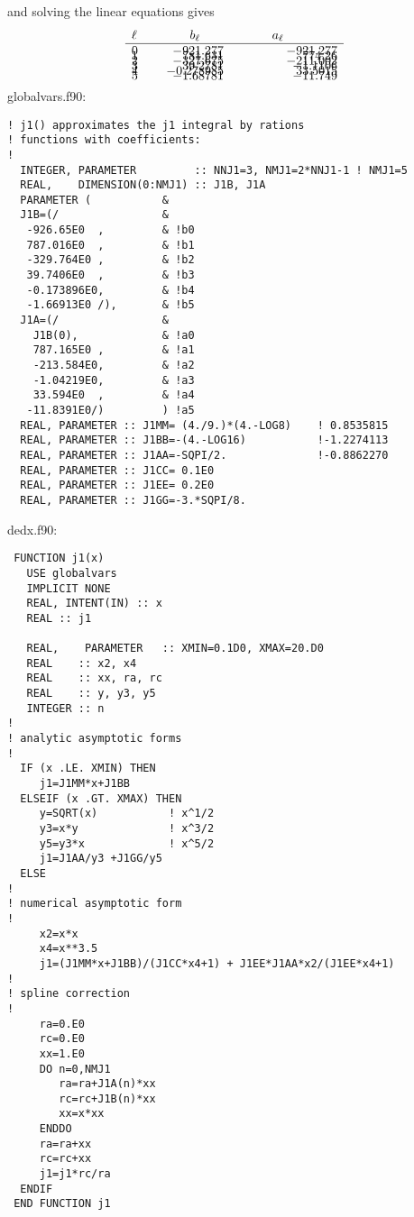 \documentclass[preprint,12pt,eqsecnum,nofootinbib,amsmath,amssymb]{revtex4}
\begin{document}
and solving the linear equations gives
\begin{eqnarray}
  \begin{array}{lrr}
  \ell~~~~ & \hfill b_\ell \hfill & \hskip1cm a_\ell \hskip1.5cm  \\ \hline
  0    &    -921.277      &   -921.277    \\[-8pt]
  1    &     781.631      &    774.26     \\[-8pt]
  2    &    -327.675      &   -211.002    \\[-8pt]
  3    &     39.2781      &   -1.1106     \\[-8pt]
  4    &    -0.278985     &   33.5015     \\[-8pt]
  5    &   -1.68781       &  -11.749      \\[-8pt]
  \end{array}
\end{eqnarray}


{
\noindent
globalvars.f90:
\baselineskip12pt
\begin{verbatim}
! j1() approximates the j1 integral by rations
! functions with coefficients:
!
  INTEGER, PARAMETER         :: NNJ1=3, NMJ1=2*NNJ1-1 ! NMJ1=5
  REAL,    DIMENSION(0:NMJ1) :: J1B, J1A
  PARAMETER (           &
  J1B=(/                &
   -926.65E0  ,         & !b0
   787.016E0  ,         & !b1
   -329.764E0 ,         & !b2
   39.7406E0  ,         & !b3
   -0.173896E0,         & !b4
   -1.66913E0 /),       & !b5
  J1A=(/                &
    J1B(0),             & !a0
    787.165E0 ,         & !a1
    -213.584E0,         & !a2
    -1.04219E0,         & !a3
    33.594E0  ,         & !a4
   -11.8391E0/)         ) !a5
  REAL, PARAMETER :: J1MM= (4./9.)*(4.-LOG8)    ! 0.8535815 
  REAL, PARAMETER :: J1BB=-(4.-LOG16)           !-1.2274113
  REAL, PARAMETER :: J1AA=-SQPI/2.              !-0.8862270
  REAL, PARAMETER :: J1CC= 0.1E0
  REAL, PARAMETER :: J1EE= 0.2E0
  REAL, PARAMETER :: J1GG=-3.*SQPI/8.
\end{verbatim}
}

{
\noindent
dedx.f90:
\baselineskip12pt
\begin{verbatim}
 FUNCTION j1(x)
   USE globalvars   
   IMPLICIT NONE
   REAL, INTENT(IN) :: x
   REAL :: j1

   REAL,    PARAMETER   :: XMIN=0.1D0, XMAX=20.D0
   REAL    :: x2, x4
   REAL    :: xx, ra, rc
   REAL    :: y, y3, y5
   INTEGER :: n
!
! analytic asymptotic forms
!
  IF (x .LE. XMIN) THEN
     j1=J1MM*x+J1BB
  ELSEIF (x .GT. XMAX) THEN
     y=SQRT(x)           ! x^1/2
     y3=x*y              ! x^3/2
     y5=y3*x             ! x^5/2
     j1=J1AA/y3 +J1GG/y5
  ELSE
!
! numerical asymptotic form
!
     x2=x*x
     x4=x**3.5
     j1=(J1MM*x+J1BB)/(J1CC*x4+1) + J1EE*J1AA*x2/(J1EE*x4+1)
!
! spline correction
! 
     ra=0.E0
     rc=0.E0
     xx=1.E0 
     DO n=0,NMJ1
        ra=ra+J1A(n)*xx
        rc=rc+J1B(n)*xx
        xx=x*xx
     ENDDO
     ra=ra+xx
     rc=rc+xx
     j1=j1*rc/ra
  ENDIF
 END FUNCTION j1
\end{verbatim}
}
\end{document}
